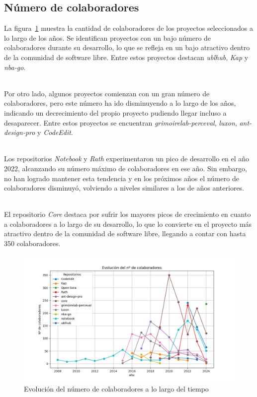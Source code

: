 \documentclass[a4paper, 12pt]{book}
\begin{document}
\subsection{Número de colaboradores}
\label{subsec:número-colaboradores}

La figura~\ref{fig:grafica-colaboradores} muestra la cantidad de colaboradores de los proyectos seleccionados a lo largo de los años. Se identifican proyectos con un bajo número de colaboradores
durante su desarrollo, lo que se refleja en un bajo atractivo dentro de la comunidad de software libre. Entre estos proyectos destacan \textit{ublhub}, \textit{Kap} y \textit{nba-go}.

\\Por otro lado, algunos proyectos comienzan con un gran número de colaboradores, pero este número ha ido disminuyendo a lo largo de los años, indicando un decrecimiento del propio proyecto
pudiendo llegar incluso a desaparecer. Entre estos proyectos se encuentran \textit{grimoirelab-perceval}, \textit{luxon}, \textit{ant-design-pro} y \textit{CodeEdit}.

\\Los repositorios \textit{Notebook} y \textit{Rath} experimentaron un pico de desarrollo en el año 2022, alcanzando su número máximo de colaboradores en ese año. Sin embargo, no han logrado mantener
esta tendencia y en los próximos años el número de colaboradores disminuyó, volviendo a niveles similares a los de años anteriores.

\\El repositorio \textit{Core} destaca por sufrir los mayores picos de crecimiento en cuanto a colaboradores a lo largo de su desarrollo, lo que lo convierte en el proyecto más atractivo dentro de la
comunidad de software libre, llegando a contar con hasta 350 colaboradores.

\begin{figure}
  \centering
  \includegraphics[width=16cm, keepaspectratio]{img/contributors_graph.png}
  \caption{Evolución del número de colaboradores a lo largo del tiempo}
  \label{fig:grafica-colaboradores}
\end{figure}
\end{document}
